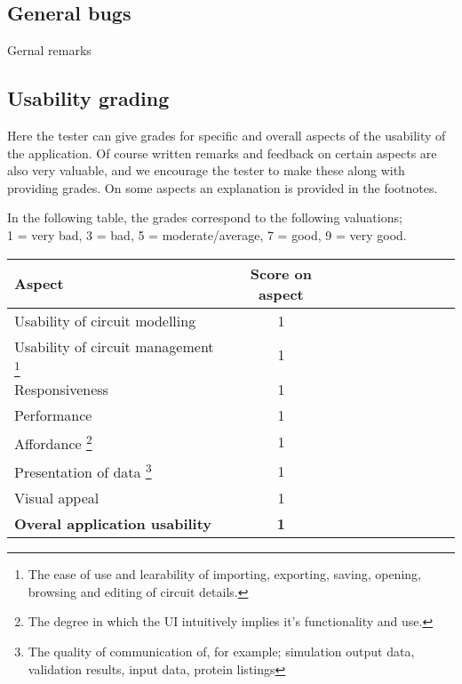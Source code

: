 \documentclass[a4paper]{article}
\begin{document}
\subsection{General bugs}
Gernal remarks

\vfill
\subsection{Usability grading}
Here the tester can give grades for specific and overall aspects of the usability of the application. Of course written remarks and feedback on certain aspects are also very valuable, and we encourage the tester to make these along with providing grades. On some aspects an explanation is provided in the footnotes.

In the following table, the grades correspond to the following valuations;\\ 1 = very bad, 3 = bad, 5 = moderate/average, 7 = good, 9 = very good.
\begin{center}
\begin{tabularx}{\textwidth}{p{10cm} cc cc c cc cc} \toprule
\textbf{Aspect} & \multicolumn{1}{c}{\textbf{Score on aspect}} \\ \midrule
Usability of circuit modelling &1\\ \midrule
Usability of circuit management \footnote{The ease of use and learability of importing, exporting, saving, opening, browsing and editing of circuit details.} &1 \\ \midrule
Responsiveness &1 \\ \midrule
Performance &1 \\ \midrule
Affordance \footnote{The degree in which the UI intuitively implies it's functionality and use.} &1 \\ \midrule
Presentation of data \footnote{The quality of communication of, for example; simulation output data, validation results, input data, protein listings} &1 \\ \midrule
Visual appeal &1 \\ \midrule
\textbf{Overal application usability} &\textbf{1} \\ \bottomrule
\end{tabularx}
\end{center}
\end{document}
